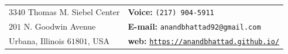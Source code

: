 \documentclass[margin,line]{res}
\begin{document}
\begin{resume}
\section{\large {}}
\begin{tabular}{@{}p{3in}p{2.84in}}
$3340$ Thomas M. Siebel Center             & \hfill {\bf Voice:}  {\tt (217) 904-5911}\\            
$201$ N. Goodwin Avenue   & \hfill {\bf E-mail:} {\tt anandbhattad92@gmail.com}\\         
Urbana, Illinois $61801$, USA  &\hfill  {\bf web:} \href{https://anandbhattad.github.io/}{\tt https://anandbhattad.github.io/}\\     
\end{tabular}



\end{resume}
\end{document}
